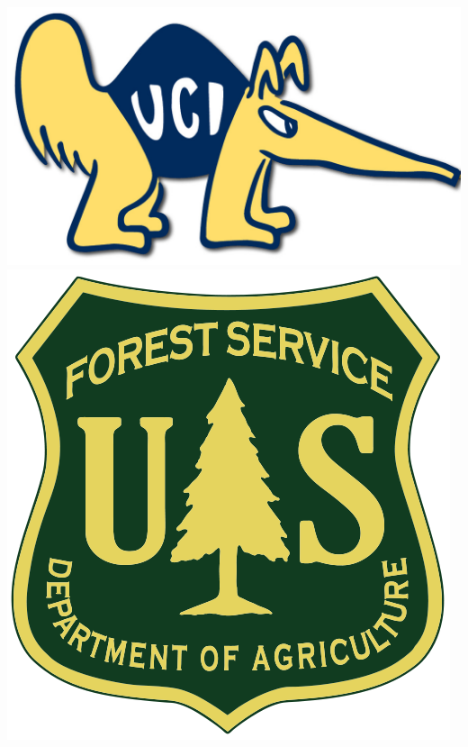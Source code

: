\documentclass{beamer}
\begin{document}
{\begin{frame}
{  \insertdate
 }
 \vbox{
  \vspace{-0.20in}\hspace{1.00in}\includegraphics[height=0.15\textheight]{logos/uci_peter.png}\hspace{0.15in}\includegraphics[height=0.15\textheight]{logos/USFS_Logo.png}}
\end{frame}
}
\end{document}
